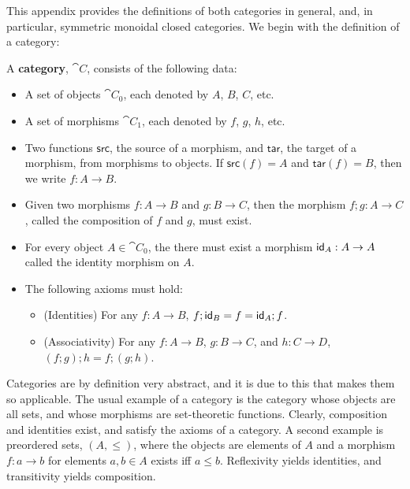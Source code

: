 This appendix provides the definitions of both categories in general,
and, in particular, symmetric monoidal closed categories.  We begin
with the definition of a category:
\begin{definition}
  \label{def:category}
  A \textbf{category}, $\cat{C}$, consists of the following data:
  \begin{itemize}
  \item A set of objects $\cat{C}_0$, each denoted by $A$, $B$, $C$, etc.
  \item A set of morphisms $\cat{C}_1$, each denoted by $f$, $g$, $h$, etc.
  \item Two functions $\mathsf{src}$, the source of a morphism, and
    $\mathsf{tar}$, the target of a morphism, from morphisms to
    objects.  If $\mathsf{src}(f) = A$ and $\mathsf{tar}(f) = B$, then
    we write $f : A \to B$.
  \item Given two morphisms $f : A \to B$ and $g : B \to C$, then the
    morphism $f;g : A \to C$, called the composition of $f$ and $g$,
    must exist.
  \item For every object $A \in \cat{C}_0$, the there must exist a
    morphism $\mathsf{id}_A : A \rightarrow A$ called the identity morphism on $A$.

  \item The following axioms must hold:
    \begin{itemize}
    \item (Identities) For any $f : A \to B$, $f;\mathsf{id}_B = f = \mathsf{id}_A;f$.
    \item (Associativity) For any $f : A \to B$, $g : B \to C$, and $h
      : C \to D$, $(f;g);h = f;(g;h)$.
    \end{itemize}
  \end{itemize}
\end{definition}

Categories are by definition very abstract, and it is due to this that
makes them so applicable.  The usual example of a category is the
category whose objects are all sets, and whose morphisms are
set-theoretic functions.  Clearly, composition and identities exist,
and satisfy the axioms of a category.  A second example is preordered
sets, $(A , \leq)$, where the objects are elements of $A$ and a
morphism $f : a \to b$ for elements $a, b \in A$ exists iff $a \leq
b$. Reflexivity yields identities, and transitivity yields
composition.  


